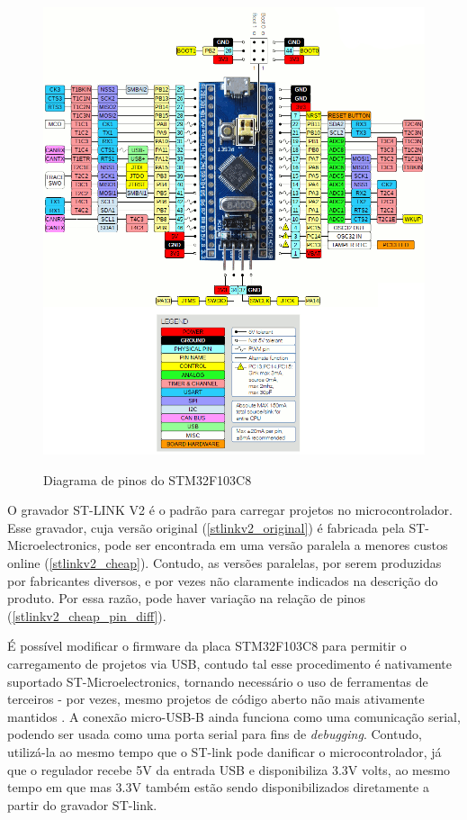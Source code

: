 \begin{figure}[ht]
	\centering
	\caption{Diagrama de pinos do STM32F103C8}
	\includegraphics[width=1.0\textwidth]{figures/stm32f1_pinout}
    \label{stm32f103c8_pinout}
\end{figure}

O gravador ST-LINK V2 é o padrão para carregar projetos no microcontrolador.
Esse gravador, cuja versão original (\autoref{stlinkv2_original}) é fabricada
pela ST-Microelectronics, pode ser encontrada em uma versão paralela a menores
custos online (\autoref{stlinkv2_cheap}). Contudo, as versões paralelas, por
serem produzidas por fabricantes diversos, e por vezes não claramente indicados 
na descrição do produto. Por essa razão, pode haver variação na relação de
pinos (\autoref{stlinkv2_cheap_pin_diff}).

É possível modificar o firmware da placa STM32F103C8 para permitir o
carregamento de projetos via USB, contudo tal esse procedimento
é nativamente suportado ST-Microelectronics, tornando necessário o uso de
ferramentas de terceiros - por vezes, mesmo projetos de código aberto não mais
ativamente mantidos \cite{stm32duino_bootloader}.
A conexão micro-USB-B ainda funciona como uma comunicação serial, podendo ser
usada como uma porta serial para fins de \textit{debugging}. Contudo, utilizá-la
ao mesmo tempo que o ST-link pode danificar o microcontrolador, já que o
regulador recebe 5V da entrada USB e disponibiliza 3.3V volts, ao mesmo tempo
em que mas 3.3V também estão sendo disponibilizados diretamente a partir do
gravador ST-link.


